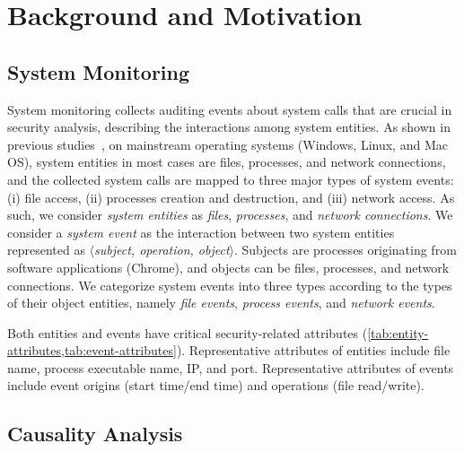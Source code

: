 \section{Background and Motivation}

\subsection{System Monitoring}
\label{subsec:system-monitoring}

System monitoring collects auditing events about system calls that are crucial in security analysis, describing the interactions among system entities.
As shown in previous studies~\cite{backtracking,backtracking2,taser,wormlog,gao2018saql,gao2018aiql,mcitracking,logtracking,liu2018priotracker,hassan2019nodoze}, on mainstream operating systems (Windows, Linux, and Mac OS), system entities in most cases are files, processes, and network connections,
and the collected system calls are mapped to three major types of system events:
(i) file access, 
(ii) processes creation and destruction, and 
(iii) network access. 
As such, we consider \emph{system entities} as \emph{files}, \emph{processes}, and \emph{network connections}. 
We consider a \emph{system event} as the interaction between two system entities represented as \emph{$\langle$subject, operation, object$\rangle$}. Subjects are processes originating from software applications (\eg Chrome), and objects can be files, processes, and network connections. 
We categorize system events into three types according to the types of their object entities, namely \emph{file events}, \emph{process events}, and \emph{network events}.


Both entities and events have critical security-related
attributes (\cref{tab:entity-attributes,tab:event-attributes}).
Representative attributes of entities include file name, process executable name, IP, and port.
Representative attributes of events include event origins (\eg start time/end time) and operations (\eg file read/write).

\subsection{Causality Analysis}
\label{subsec:causality-analysis}


